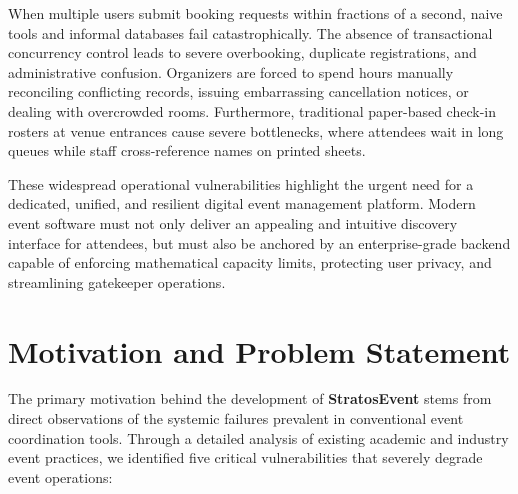 \documentclass[11pt,a4paper]{report}
\begin{document}
When multiple users submit booking requests within fractions of a second, naive tools and informal databases fail catastrophically. The absence of transactional concurrency control leads to severe overbooking, duplicate registrations, and administrative confusion. Organizers are forced to spend hours manually reconciling conflicting records, issuing embarrassing cancellation notices, or dealing with overcrowded rooms. Furthermore, traditional paper-based check-in rosters at venue entrances cause severe bottlenecks, where attendees wait in long queues while staff cross-reference names on printed sheets.

These widespread operational vulnerabilities highlight the urgent need for a dedicated, unified, and resilient digital event management platform. Modern event software must not only deliver an appealing and intuitive discovery interface for attendees, but must also be anchored by an enterprise-grade backend capable of enforcing mathematical capacity limits, protecting user privacy, and streamlining gatekeeper operations.

\section{Motivation and Problem Statement}
\justifying
The primary motivation behind the development of \textbf{StratosEvent} stems from direct observations of the systemic failures prevalent in conventional event coordination tools. Through a detailed analysis of existing academic and industry event practices, we identified five critical vulnerabilities that severely degrade event operations:
\end{document}
